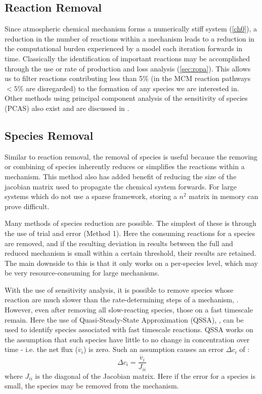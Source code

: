 \subsection{Reaction Removal}
Since atmospheric chemical mechanism forms a numerically stiff system (\autoref{ch0}), a reduction in the number of reactions within a mechanism leads to a reduction in the computational burden experienced by a model each iteration forwards in time. Classically the identification of important reactions may be accomplished through the use or rate of production and loss analysis (\autoref{sec:ropa}). This allows us to filter reactions contributing less than 5\% (in the MCM reaction pathways $<5\%$ are disregarded) to the formation of any species we are interested in. Other methods using principal component analysis of the sensitivity of species (PCAS) also exist and are discussed in \citep{PCAS,wyche}.


\subsection{Species Removal}
Similar to reaction removal, the removal of species is useful because the removing or combining of species inherently reduces or simplifies the reactions within a mechanism.  This method also has added benefit of reducing the size of the jacobian matrix used to propagate the chemical system forwards. For large systems which do not use a sparse framework, storing a $n^2$ matrix in memory can prove difficult.

Many methods of species reduction are possible. The simplest of these is through the use of trial and error \citep{tur1990} (Method 1). Here the consuming reactions for a species are removed, and if the resulting deviation in results between the full and reduced mechanism is small within a certain threshold, their results are retained. The main downside to this is that it only works on a per-species level, which may be very resource-consuming for large mechanisms.

With the use of sensitivity analysis, it is possible to remove species whose reaction are much slower than the rate-determining steps of a mechanism, \citep{frenk}. However, even after removing all slow-reacting species, those on a fast timescale remain. Here the use of Quasi-Steady-State Approximation (QSSA), \citep{QSSA}, can be used to identify species associated with fast timescale reactions. QSSA works on the assumption that such species have little to no change in concentration over time - i.e. the net flux ($\dot{v_i}$) is zero. Such an assumption causes an error $\Delta c_i$ of :
\begin{equation}
    \Delta c_i = \frac{\dot{v_i}}{J_{ii}}
\end{equation}
where $J_{ii}$ is the diagonal of the Jacobian matrix. Here if the error for a species is small, the species may be removed from the mechanism.


